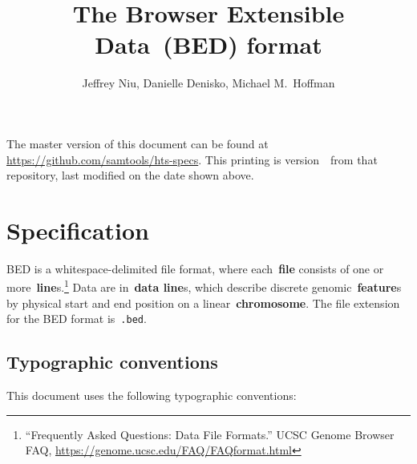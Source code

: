 \documentclass[11pt]{article}
\title{The Browser Extensible Data~(BED) format}
\author{Jeffrey Niu, Danielle Denisko, Michael M.~Hoffman}
\date{\headdate}
\providecommand*{\Ac}[1]{\ac{#1}} %
\begin{document}
\maketitle

\begin{small}
\noindent
The master version of this document can be found at \url{https://github.com/samtools/hts-specs}.
This printing is version~\commitdesc\ from that repository, last modified on the date shown above.
\end{small}


\section{Specification}

\Ac{BED} is a whitespace-delimited file format, where each~\textbf{file} consists of one or more~\textbf{line}s.\footnote{``Frequently Asked Questions: Data File Formats.'' \ac{UCSC} Genome Browser FAQ, \url{https://genome.ucsc.edu/FAQ/FAQformat.html}}
Data are in~\textbf{data line}s, which describe discrete genomic~\textbf{feature}s by physical start and end position on a linear~\textbf{chromosome}.
The file extension for the \ac{BED} format is~\texttt{.bed}.

\subsection{Typographic conventions}

This document uses the following typographic conventions:

\vspace{2ex}

\noindent
{}
\end{document}
